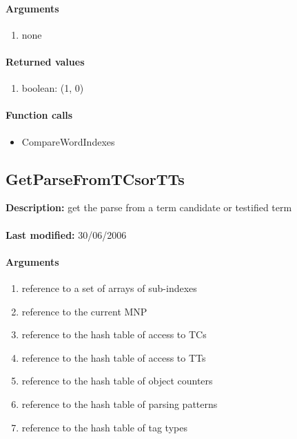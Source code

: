 \paragraph{Arguments}
\begin{enumerate}
\item none
\end{enumerate}

\paragraph{Returned values}
\begin{enumerate}
\item boolean: (1, 0)
\end{enumerate}

\paragraph{Function calls}
\begin{itemize}
\item CompareWordIndexes
\end{itemize}

\subsection{GetParseFromTCsorTTs}
\textbf{Description:} get the parse from a term candidate or testified term\\
\\\textbf{Last modified:} 30/06/2006

\paragraph{Arguments}
\begin{enumerate}
\item reference to a set of arrays of sub-indexes
\item reference to the current MNP
\item reference to the hash table of access to TCs
\item reference to the hash table of access to TTs
\item reference to the hash table of object counters
\item reference to the hash table of parsing patterns
\item reference to the hash table of tag types
\end{enumerate}

